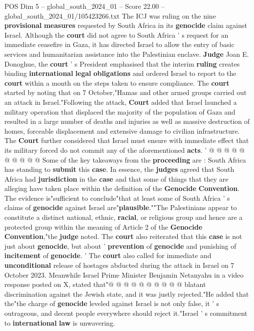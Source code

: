\begin{textsample}{POS Dim 5 – global\_south\_2024\_01 – Score 22.00 – global\_south\_2024\_01/105423266.txt}  \label{ex:f5_pos_007}
The ICJ was ruling on the nine \textbf{provisional} \textbf{measures} requested by South Africa in its \textbf{genocide} claim against Israel.
Although the \textbf{court} did not agree to South Africa ' s request for an immediate ceasefire in Gaza, it has directed Israel to allow the entry of basic services and humanitarian assistance into the Palestinian enclave. \textbf{Judge} Joan E.
Donoghue, the \textbf{court} ' s President emphasised that the interim \textbf{ruling} creates binding \textbf{international} \textbf{legal} \textbf{obligations} and ordered Israel to report to the \textbf{court} within a month on the steps taken to ensure compliance.
The \textbf{court} started by noting that on 7 October,"Hamas and other armed groups carried out an attack in Israel."Following the attack, \textbf{Court} added that Israel launched a military operation that displaced the majority of the population of Gaza and resulted in a large number of deaths and injuries as well as massive destruction of homes, forceable displacement and extensive damage to civilian infrastructure.
The \textbf{Court} further considered that Israel must ensure with immediate effect that its military forced do not commit any of the aforementioned \textbf{acts}. ' @ @ @ @ @ @ @ @ @ @ Some of the key takeaways from the \textbf{proceeding} are : South Africa has standing to \textbf{submit} this \textbf{case}.
In essence, the \textbf{judges} agreed that South Africa had \textbf{jurisdiction} in the \textbf{case} and that some of things that they are alleging have taken place within the definition of the \textbf{Genocide} \textbf{Convention}.
The evidence is"sufficient to conclude"that at least some of South Africa ' s claims of \textbf{genocide} against Israel are"\textbf{plausible}.""The Palestinians appear to constitute a distinct national, ethnic, \textbf{racial}, or religious group and hence are a protected group within the meaning of Article 2 of the \textbf{Genocide} \textbf{Convention},"the \textbf{judge} noted.
The \textbf{court} also reiterated that this \textbf{case} is not just about \textbf{genocide}, but about ' \textbf{prevention} of \textbf{genocide} and punishing of \textbf{incitement} of \textbf{genocide}. ' The \textbf{court} also called for immediate and \textbf{unconditional} release of hostages abducted during the attack in Israel on 7 October 2023.
Meanwhile Israel Prime Minister Benjamin Netanyahu in a video response posted on X, stated that"@ @ @ @ @ @ @ @ @ @ blatant discrimination against the Jewish state, and it was justly rejected."He added that the"the charge of \textbf{genocide} leveled against Israel is not only false, it ' s outrageous, and decent people everywhere should reject it."Israel ' s commitment to \textbf{international} \textbf{law} is unwavering.

\end{textsample}
